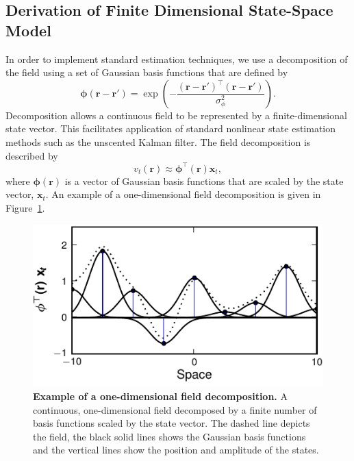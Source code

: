 \documentclass[10pt]{article}
\begin{document}
\subsection{Derivation of Finite Dimensional State-Space Model}\label{Sect:ReducedModelDerivation}
In order to implement standard estimation techniques, we use a decomposition of the field using a set of Gaussian basis functions that are defined by
\begin{equation}\label{eq:FieldBasisFunction}
	\boldsymbol\phi\left(\mathbf{r}-\mathbf{r}'\right) =
\exp{\left(-\frac{(\mathbf{r}-\mathbf{r}')^\top(\mathbf{r}-\mathbf{r}')}{\sigma_{\phi}^2}\right)}. 
\end{equation}
Decomposition allows a continuous field to be represented by a finite-dimensional state vector. This facilitates application of standard nonlinear state estimation methods such as the unscented Kalman filter. The field decomposition is described by 
\begin{equation}
	\label{DefFieldDecomp} v_t\left(\mathbf{r}\right) \approx \boldsymbol{\phi}^{\top}\left(\mathbf{r}\right) \mathbf{x}_t, 
\end{equation}
where $\mathbf{\boldsymbol{\phi}}(\mathbf{r})$ is a vector of Gaussian basis functions that are scaled by the state vector, $\mathbf{x}_t$. An example of a one-dimensional field decomposition is given in Figure~\ref{fig:FieldDecomposition}.%
\begin{figure}
   	\begin{center}
   		\includegraphics{./Graph/FieldDecomposition.pdf} 
   	\end{center}
   	\caption{{\bf Example of a one-dimensional field decomposition.} A continuous, one-dimensional field decomposed by a finite number of basis functions scaled by the state vector. The dashed line depicts the field, the black solid lines shows the Gaussian basis functions and the vertical lines show the position and amplitude of the states.} 
	\label{fig:FieldDecomposition}
   \end{figure}
\end{document}
